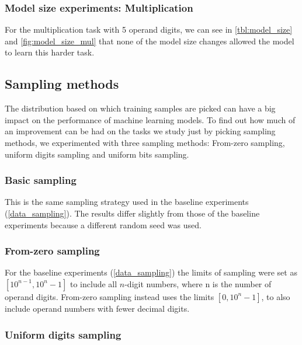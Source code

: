 

\subsubsection{Model size experiments: Multiplication}


For the multiplication task with 5 operand digits, we can see in \cref{tbl:model_size} and \cref{fig:model_size_mul} that none of the model size changes allowed the model to learn this harder task.

\subsection{Sampling methods}
\label{sampling methods}

The distribution based on which training samples are picked can have a big impact on the performance of machine learning models. To find out how much of an improvement can be had on the tasks we study just by picking sampling methods, we experimented with three sampling methods: From-zero sampling, uniform digits  sampling and uniform bits sampling.

\subsubsection{Basic sampling}

This is the same sampling strategy used in the baseline experiments (\cref{data_sampling}). The results differ slightly from those of the baseline experiments because a different random seed was used.

\subsubsection{From-zero sampling}

For the baseline experiments (\cref{data_sampling}) the limits of sampling were set as $[10^{n-1}, 10^n - 1]$ to include all $n$-digit numbers, where n is the number of operand digits. From-zero sampling instead uses the limits $[0, 10^n - 1]$, to also include operand numbers with fewer decimal digits.

\subsubsection{Uniform digits sampling}

